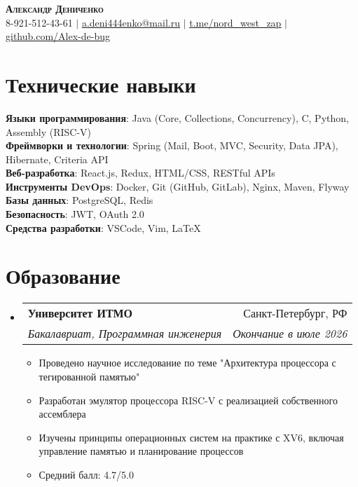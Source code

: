\documentclass[letterpaper,11pt]{article}
\makeatletter
\newcommand{\resumeItem}[1]{
  \item\small{
    {#1 \vspace{-2pt}}
  }
}
\newcommand{\resumeSubheading}[4]{
  \vspace{-2pt}\item
    \begin{tabular*}{0.97\textwidth}[t]{l@{\extracolsep{\fill}}r}
      \textbf{#1} & #2 \\
      \textit{\small#3} & \textit{\small #4} \\
    \end{tabular*}\vspace{-7pt}
}
\newcommand{\resumeSubHeadingListStart}{\begin{itemize}[leftmargin=0.15in, label={}]}
\newcommand{\resumeSubHeadingListEnd}{\end{itemize}}
\newcommand{\resumeItemListStart}{\begin{itemize}}
\newcommand{\resumeItemListEnd}{\end{itemize}\vspace{-5pt}}
\makeatother
\begin{document}


\begin{center}
    \textbf{\Huge \scshape Александр Дениченко} \\ \vspace{1pt}
    \small 8-921-512-43-61 $|$ \href{mailto:a.deni444enko@mail.ru}{\underline{a.deni444enko@mail.ru}} $|$ 
    \href{https://t.me/nord_west_zap}{\underline{t.me/nord\_west\_zap}} $|$
    \href{https://github.com/Alex-de-bug}{\underline{github.com/Alex-de-bug}}
\end{center}

\section{Технические навыки}
 \begin{itemize}[leftmargin=0.15in, label={}]
    \small{\item{
     \textbf{Языки программирования}{: Java (Core, Collections, Concurrency), C, Python, Assembly (RISC-V)} \\
     \textbf{Фреймворки и технологии}{: Spring (Mail, Boot, MVC, Security, Data JPA), Hibernate, Criteria API} \\
     \textbf{Веб-разработка}{: React.js, Redux, HTML/CSS, RESTful APIs} \\
     \textbf{Инструменты DevOps}{: Docker, Git (GitHub, GitLab), Nginx, Maven, Flyway} \\
     \textbf{Базы данных}{: PostgreSQL, Redis} \\
     \textbf{Безопасность}{: JWT, OAuth 2.0} \\
     \textbf{Средства разработки}{: VSCode, Vim, LaTeX}
    }}
 \end{itemize}


\section{Образование}
  \resumeSubHeadingListStart
    \resumeSubheading
      {Университет ИТМО}{Санкт-Петербург, РФ}
      {Бакалавриат, Программная инженерия}{Окончание в июле 2026}
          \resumeItemListStart
            \resumeItem{Проведено научное исследование по теме "Архитектура процессора с тегированной памятью"}
            \resumeItem{Разработан эмулятор процессора RISC-V с реализацией собственного ассемблера}
            \resumeItem{Изучены принципы операционных систем на практике с XV6, включая управление памятью и планирование процессов}
            \resumeItem{Средний балл: 4.7/5.0}
        \resumeItemListEnd
  \resumeSubHeadingListEnd
\end{document}
